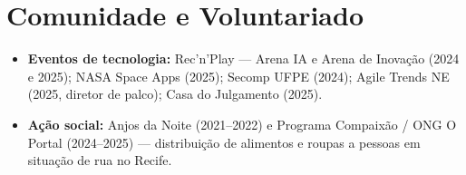 \documentclass[a4paper,10.5pt]{article}
\begin{document}
\section{Comunidade e Voluntariado}
\begin{itemize}
  \item \textbf{Eventos de tecnologia:} Rec'n'Play --- Arena IA e Arena de Inovação (2024 e 2025); NASA Space Apps (2025); Secomp UFPE (2024); Agile Trends NE (2025, diretor de palco); Casa do Julgamento (2025).
  \item \textbf{Ação social:} Anjos da Noite (2021--2022) e Programa Compaixão / ONG O Portal (2024--2025) --- distribuição de alimentos e roupas a pessoas em situação de rua no Recife.
\end{itemize}
\end{document}
